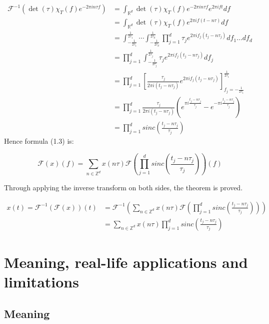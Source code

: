 \documentclass[a4paper, 11pt]{scrreprt}
\newcommand{\RR}{\mathbb{R}}
\newcommand{\ZZ}{\mathbb{Z}}
\newcommand{\FF}{\mathcal{F}}
\begin{document}
\begin{align*}
\FF^{-1}\left( \det(\tau) \chi_{T}(f) e^{-2 \pi i n \tau f}\right) 
&= \int_{\RR^d} \det(\tau) \chi_{T}(f) e^{-2 \pi i n \tau f} e^{2 \pi i f t} df \\
&= \int_{\RR^d} \det(\tau) \chi_{T}(f) e^{2 \pi i f (t-n\tau) }df \\
&= \int_{-\frac{1}{2\tau_1}}^{\frac{1}{2\tau_1}} \cdots \int_{-\frac{1}{2\tau_d}}^{\frac{1}{2\tau_d}} \prod_{j=1}^d \tau_j e^{2 \pi i f_j(t_j-n \tau_j)}df_1 \ldots df_d \\
&= \prod_{j=1}^d \int_{-\frac{1}{2\tau_j}}^{\frac{1}{2\tau_j}} \tau_j e^{2 \pi i f_j (t_j - n \tau_j)}df_j \\
&= \prod_{j=1}^d \left[  \frac{\tau_j}{2 \pi i (t_j - n \tau_j)} e^{2 \pi i f_j (t_j - n \tau_j)} \right]_{f_j = -\frac{1}{2\tau_1}}^{\frac{1}{2\tau_1}} \\
&= \prod_{j=1}^d \frac{\tau_j}{2 \pi i (t_j - n \tau_j)} \left( e^{\pi i \frac{t_j - n \tau_j}{\tau_j}} - e^{-\pi i \frac{t_j - n \tau_j}{\tau_j}} \right) \\
&= \prod_{j=1}^d sinc \left( \frac{t_j - n \tau_j}{\tau_j} \right)
\end{align*}
Hence formula (1.3) is:

\[\FF(x)(f) = \sum_{n \in \ZZ^d} x(n\tau) \FF\left(\prod_{j=1}^d sinc \left( \frac{t_j - n \tau_j}{\tau_j} \right) \right)(f)\]

Through applying the inverse transform on both sides, the theorem is proved.

\begin{align*}
x(t) = \FF^{-1}(\FF(x))(t) &= \FF^{-1} \left( \sum_{n \in \ZZ^d} x(n \tau) \FF \left( \prod_{j=1}^d sinc \left( \frac{t_j - n \tau_j}{\tau_j} \right) \right) \right) \\
&= \sum_{n \in \ZZ^d} x(n\tau) \prod_{j=1}^d sinc \left( \frac{t_j - n \tau_j}{\tau_j} \right)
\end{align*}

\section{Meaning, real-life applications and limitations}

\subsection{Meaning}
\end{document}
